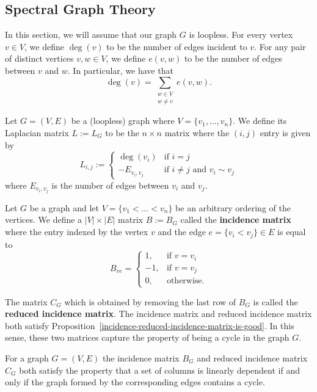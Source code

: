\documentclass{puthesis-UG}
\begin{document}
\subsection{Spectral Graph Theory} \label{sec:spectral-graph-theory}

In this section, we will assume that our graph $G$ is loopless. For every vertex $v \in V$, we define $\deg(v)$ to be the number of edges incident to $v$. For any pair of distinct vertices $v, w \in V$, we define $e(v, w)$ to be the number of edges between $v$ and $w$. In particular, we have that 
\[
	\deg (v) = \sum_{\substack{w \in V \\ w \neq v}} e(v, w).
\]

\begin{defn}
	Let $G = (V, E)$ be a (loopless) graph where $V = \{v_1, \ldots, v_n\}$. We define its Laplacian matrix $L := L_G$ to be the $n \times n$ matrix where the $(i, j)$ entry is given by 
	\[
		L_{i, j} := \begin{cases}
			\deg (v_i) & \text{if $i = j$} \\
			-E_{v_i, v_j} & \text{if $i \neq j$ and $v_i \sim v_j$}
		\end{cases}
	\]
	where $E_{v_i, v_j}$ is the number of edges between $v_i$ and $v_j$. 
\end{defn}

\begin{defn} \label{def:incidence-matrix}
	Let $G$ be a graph and let $V = \{v_1 < \ldots < v_n\}$ be an arbitrary ordering of the vertices. We define a $|V| \times |E|$ matrix $B := B_G$ called the \textbf{incidence matrix} where the entry indexed by the vertex $v$ and the edge $e = \{v_i < v_j\} \in E$ is equal to 
	\[
		B_{ve} = \begin{cases}
			1, & \text{if $v = v_i$} \\
			-1, & \text{if $v = v_j$} \\
			0, & \text{otherwise.}
		\end{cases}
	\] 
\end{defn}

The matrix $C_G$ which is obtained by removing the last row of $B_G$ is called the \textbf{reduced incidence matrix}. The incidence matrix and reduced incidence matrix both satisfy Proposition~\ref{incidence-reduced-incidence-matrix-is-good}. In this sense, these two matrices capture the property of being a cycle in the graph $G$.  

\begin{prop} \label{incidence-reduced-incidence-matrix-is-good}
	For a graph $G = (V, E)$ the incidence matrix $B_G$ and reduced incidence matrix $C_G$ both satisfy the property that a set of columns is linearly dependent if and only if the graph formed by the corresponding edges contains a cycle. 
\end{prop}
\end{document}
